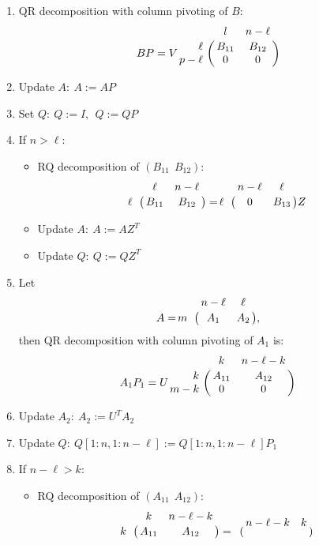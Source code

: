 \begin{enumerate}[(1)]
\item QR decomposition with column pivoting of $B$:
             	\[
                    BP = V\bordermatrix{ & l & n-\ell \cr
                    \hfill \ell & B_{11} & B_{12} \cr
                    \hfill p-\ell & 0 & 0 \cr}
                \]
                \item Update $A: \ A := AP$
                \item Set $Q: \  Q := I, \ \ Q := QP$
                \item If $n > \ell$:
                    \begin{itemize}
                        \item RQ decomposition of $(B_{11} \ \ B_{12})$:
                            \[
                               \bordermatrix{ & \ell & n-\ell \cr
                                \hfill \ell & B_{11} & B_{12} \cr}
                                = \bordermatrix{ & n-\ell & \ell \cr
                                \hfill \ell & 0 & B_{13} \cr}Z
                            \]
                        \item Update $A: \ A := AZ^{T}$
                        \item Update $Q: \ Q := QZ^{T}$
                    \end{itemize}
                \item Let
                    \[
                    	A = \bordermatrix{ & n-\ell & \ell \cr
                            \hfill m & A_{1} & A_{2} \cr},
                    \]
                    then QR decomposition with column pivoting of $A_1$ is:
                    \[
                        A_{1}P_{1} = U\bordermatrix{ & k & n-\ell-k \cr
                        \hfill k & A_{11} & A_{12} \cr
                        \hfill m-k & 0 & 0 \cr}
                    \]
                \item Update $A_{2}: \ A_{2} := U^{T}A_{2}$
                \item Update $Q: \ Q[1:n, 1:n-\ell] := Q[1:n, 1:n-\ell]P_{1}$
                \item If $n-\ell > k$:
                    \begin{itemize}
                        \item RQ decomposition of $(A_{11} \ \ A_{12})$:
                            \[
                                \bordermatrix{ & k & n-\ell-k \cr
                                \hfill k & A_{11} & A_{12} \cr}
                                = \bordermatrix{ & n-\ell-k & k \cr
}\]
\end{itemize}
\end{enumerate}
